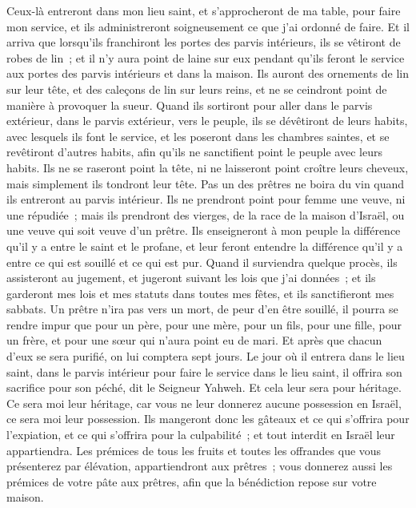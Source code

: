 \begin{multicols}{2}
Ceux-là entreront dans mon lieu saint, et s'approcheront de ma table, pour faire mon service, et ils administreront soigneusement ce que j'ai ordonné de faire.
Et il arriva que lorsqu'ils franchiront les portes des parvis intérieurs, ils se vêtiront de robes de lin~; et il n'y aura point de laine sur eux pendant qu'ils feront le service aux portes des parvis intérieurs et dans la maison.
Ils auront des ornements de lin sur leur tête, et des caleçons de lin sur leurs reins, et ne se ceindront point de manière à provoquer la sueur.
Quand ils sortiront pour aller dans le parvis extérieur, dans le parvis extérieur, vers le peuple, ils se dévêtiront de leurs habits, avec lesquels ils font le service, et les poseront dans les chambres saintes, et se revêtiront d'autres habits, afin qu'ils ne sanctifient point le peuple avec leurs habits.
Ils ne se raseront point la tête, ni ne laisseront point croître leurs cheveux, mais simplement ils tondront leur tête.
Pas un des prêtres ne boira du vin quand ils entreront au parvis intérieur.
Ils ne prendront point pour femme une veuve, ni une répudiée~; mais ils prendront des vierges, de la race de la maison d'Israël, ou une veuve qui soit veuve d'un prêtre.
Ils enseigneront à mon peuple la différence qu'il y a entre le saint et le profane, et leur feront entendre la différence qu'il y a entre ce qui est souillé et ce qui est pur.
Quand il surviendra quelque procès, ils assisteront au jugement, et jugeront suivant les lois que j'ai données~; et ils garderont mes lois et mes statuts dans toutes mes fêtes, et ils sanctifieront mes sabbats.
Un prêtre n'ira pas vers un mort, de peur d'en être souillé, il pourra se rendre impur que pour un père, pour une mère, pour un fils, pour une fille, pour un frère, et pour une sœur qui n'aura point eu de mari.
Et après que chacun d'eux se sera purifié, on lui comptera sept jours.
Le jour où il entrera dans le lieu saint, dans le parvis intérieur pour faire le service dans le lieu saint, il offrira son sacrifice pour son péché, dit le Seigneur Yahweh.
Et cela leur sera pour héritage. Ce sera moi leur héritage, car vous ne leur donnerez aucune possession en Israël, ce sera moi leur possession.
Ils mangeront donc les gâteaux et ce qui s'offrira pour l'expiation, et ce qui s'offrira pour la culpabilité~; et tout interdit en Israël leur appartiendra.
Les prémices de tous les fruits et toutes les offrandes que vous présenterez par élévation, appartiendront aux prêtres~; vous donnerez aussi les prémices de votre pâte aux prêtres, afin que la bénédiction repose sur votre maison.

\end{multicols}
